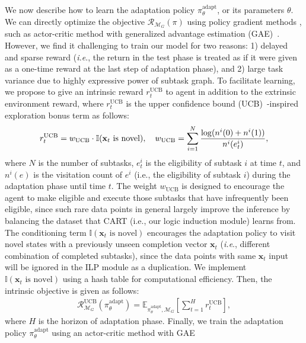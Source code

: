 \documentclass{article} \usepackage{iclr2020_conference,times}
\makeatletter
\newcommand{\mb}{\mathbf}
\newcommand{\mbb}{\mathbb}
\newcommand{\mc}{\mathcal}
\DeclareRobustCommand\onedot{\futurelet\@let@token\@onedot}
\def\onedot{.}
\def\ie{\emph{i.e}\onedot} \def\Ie{\emph{I.e}\onedot}
\makeatother
\begin{document}
We now describe how to learn the adaptation policy $\pi_\theta^\text{adapt}$, or its parameters $\theta$.
We can directly optimize the objective $\mathcal R_{\mc{M}_G}(\pi)$
using policy gradient methods \citep{williams1992REINFORCE,Sutton:1999:PG},
such as actor-critic method with generalized advantage estimation (GAE)~\citep{schulman2015high}.
However, we find it challenging to train our model for two reasons:
1) delayed and sparse reward (\ie, the return in the test phase is treated as if it were given as a one-time reward at the last step of adaptation phase),
and 2) large task variance due to highly expressive power of subtask graph.
To facilitate learning, we propose to give an intrinsic reward $r_t^{\text{UCB}}$ to agent in addition to the extrinsic environment reward, where $r_t^{\text{UCB}}$ is the upper confidence bound (UCB)~\citep{auer2002finite}-inspired exploration bonus term as follows:
\begin{align}
    r_t^{\text{UCB}}    = w_\text{UCB} \cdot \mathbb{I}(\mb{x}_t\text{ is novel}),\label{eq:UCB-bonus}      \quad
    w_\text{UCB}        =\sum_{i=1}^{N}{ \smash{\frac{\log( n^i(0)+n^i(1) )}{ n^i(e_t^i) } } },
\end{align}
where $N$ is the number of subtasks, $e_t^i$ is the eligibility of subtask $i$ at time $t$, and $n^i(e)$ is the visitation count of $e^i$ (i.e., the eligibility of subtask $i$) during the adaptation phase until time $t$.
The weight $w_\text{UCB}$ is designed to encourage the agent to make eligible and execute those subtasks that have infrequently been eligible, since such rare data points in general largely improve the inference by balancing the dataset that CART (i.e., our logic induction module) learns from.
The conditioning term $\mbb{I}(\mb{x}_t\text{ is novel})$ encourages
the adaptation policy to visit novel states with a previously unseen completion vector $\mb{x}_t$
(\ie, different combination of completed subtasks),
since the data points with same $\mb{x}_t$ input will be ignored in the ILP module as a duplication.
We implement $\mbb{I}(\mb{x}_t\text{ is novel})$ using a hash table for computational efficiency.
Then, the intrinsic objective is given as follows:
\begin{align}
    \mc{R}^{\text{UCB}}_{\mc{M}_G} \left( \pi^\text{adapt}_{\theta} \right)
    = \mathbb{E}_{\pi_{\theta}^\text{adapt}, \mc{M}_{G} }\left[
            \textstyle\sum^{H}_{t=1}{r^{\text{UCB}}_t}
    \right],  \label{eq:UCB-loss}
\end{align}
where $H$ is the horizon of adaptation phase.
Finally, we train the adaptation policy $\pi^\text{adapt}_{\theta}$ using an actor-critic method with GAE~\citep{schulman2015high}
\end{document}
